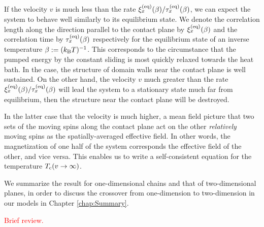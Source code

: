 If the velocity $v$ is much less than the rate $\xi^{(\rm eq)}_{x}(\beta)/\tau^{(\rm eq)}_{x}(\beta)$, we can expect the system to behave well similarly to its equilibrium state. We denote the correlation length along the direction parallel to the contact plane by $\xi^{(\rm eq)}_{x}(\beta)$ and the correlation time by $\tau^{(\rm eq)}_{x}(\beta)$ respectively for the equilibrium state of an inverse temperature $\beta:=(k_{\rm B}T)^{-1}$. This corresponds to the circumstance that the pumped energy by the constant sliding is most quickly relaxed towards the heat bath. In the case, the structure of domain walls near the contact plane is well sustained. On the other hand, the velocity $v$ much greater than the rate $\xi^{(\rm eq)}_{x}(\beta)/\tau^{(\rm eq)}_{x}(\beta)$ will lead the system to a stationary state much far from equilibrium, then the structure near the contact plane will be destroyed. 

In the latter case that the velocity is much higher, a mean field picture that two sets of the moving spins along the contact plane act on the other \textit{relatively} moving spins as the spatially-averaged effective field. In other words, the magnetization of one half of the system corresponds the effective field of the other, and vice versa. This enables us to write a self-consistent equation for the temperature $T_{\rm c}(v\to\infty)$.

We summarize the result for one-dimensional chains and that of two-dimensional planes, in order to discuss the crossover from one-dimension to two-dimension in our models in Chapter \ref{chap:Summary}.

\textcolor{red}{Brief review.}